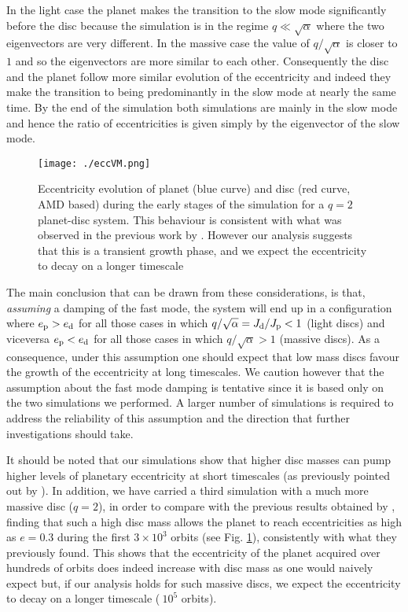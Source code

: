 \documentclass[usenatbib,a4paper,times,fleqn]{mnras}
\begin{document}
In the light case the planet makes the transition to the slow mode significantly before the disc because the simulation is in the regime $q \ll \sqrt{\alpha}$ where the two eigenvectors are very different. In the massive case the value of $q/\sqrt{\alpha}$ is closer to $1$ and so the eigenvectors are more similar to each other. Consequently the disc and the planet follow more similar evolution of the eccentricity and indeed they make the transition to being predominantly in the slow mode at nearly the same time. By the end of the simulation both simulations are mainly in the slow mode and hence the ratio of eccentricities is given simply by the eigenvector of the slow mode.

\begin{figure}
\texttt{[image: ./eccVM.png]}
\caption{Eccentricity evolution of planet (blue curve) and disc (red curve, AMD based) during the early stages of the simulation for a $q=2$ planet-disc system. This behaviour is consistent with what was observed in the previous work by \citet{papaloizou2001}. However our analysis suggests that this is a transient growth phase, and we expect the eccentricity to decay on a longer timescale}\label{eccVM}
\end{figure}

The main conclusion that can be drawn from these considerations, is that, {\it assuming} a damping of the fast mode, the system will end up in a configuration where $e_{\rm p}>e_{\rm d}$ for all those cases in which $q/\sqrt{\alpha}=J_{\rm d}/J_{\rm p}<1$ (light discs) and viceversa $e_{\rm p}<e_{\rm d}$ for all those cases in which $q/\sqrt{\alpha}>1$ (massive discs). As a consequence, under this assumption one should expect that low mass discs favour the growth of the eccentricity at long timescales.
We caution however that the assumption about the fast mode damping is tentative since it is based only on the two simulations we performed. A larger number of simulations is required to address the reliability of this assumption and the direction that further investigations should take.

It should be noted that our simulations show that higher disc masses can pump higher levels of planetary eccentricity at short timescales (as previously pointed out by \citealp{dunhill2013}). In addition, we have carried a third simulation with a much more massive disc ($q=2$), in order to compare with the previous results obtained by \citet{papaloizou2001}, finding that such a high disc mass allows the planet to reach eccentricities as high as $e=0.3$ during the first $3\times 10^3$ orbits (see Fig. \ref{eccVM}), consistently with what they previously found. This shows that the eccentricity of the planet acquired over hundreds of orbits does indeed increase with disc mass as one would naively expect but, if our analysis holds for such massive discs, we expect the eccentricity to decay on a longer timescale ($~10^5$ orbits).
\end{document}
